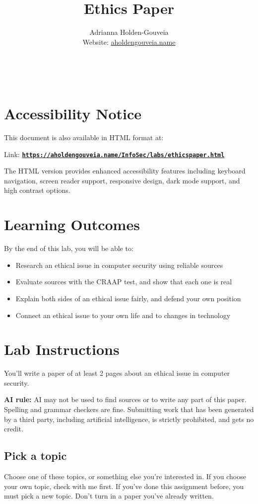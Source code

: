 \documentclass[12pt]{article}
\title{Ethics Paper}
\author{
        Adrianna Holden-Gouveia \\
        Website: \href{https://aholdengouveia.name}{aholdengouveia.name}\\ 
        \date{\vspace{-5ex}}
        \faGithub {: aholdengouveia} \\
        \faTwitter {: aholdengouveia} \\
        }
\begin{document}
    

\maketitle

\section*{Accessibility Notice}
This document is also available in HTML format at:

Link: \href{https://aholdengouveia.name/InfoSec/labs/ethicspaper.html}{\textbf{\nolinkurl{https://aholdengouveia.name/InfoSec/labs/ethicspaper.html}}}

The HTML version provides enhanced accessibility features including keyboard navigation, screen reader support, responsive design, dark mode support, and high contrast options.




\section*{Learning Outcomes}
By the end of this lab, you will be able to:
\begin{itemize}
    \item Research an ethical issue in computer security using reliable sources
    \item Evaluate sources with the CRAAP test, and show that each one is real
    \item Explain both sides of an ethical issue fairly, and defend your own position
    \item Connect an ethical issue to your own life and to changes in technology
\end{itemize}

\section*{Lab Instructions}
You'll write a paper of at least 2 pages about an ethical issue in computer security.

\textbf{AI rule:} AI may not be used to find sources or to write any part of this paper. Spelling and grammar checkers are fine. Submitting work that has been generated by a third party, including artificial intelligence, is strictly prohibited, and gets no credit.

\subsection*{Pick a topic}
Choose one of these topics, or something else you're interested in. If you choose your own topic, check with me first. If you've done this assignment before, you must pick a new topic. Don't turn in a paper you've already written.
\end{document}
